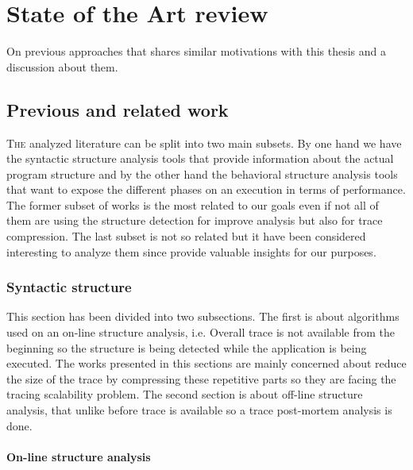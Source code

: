 \chapter{State of the Art review}

On previous approaches that shares similar motivations with this thesis and a
discussion about them. 

\section{Previous and related work}\label{related_work}

\lettrine{T}{he} analyzed literature can be split into two main subsets. By one hand we have 
the syntactic structure analysis tools that provide information about the actual 
program structure and by the other hand the behavioral structure analysis tools
that want to expose the different phases on an execution in terms of performance. 
The former subset of works is the most related to our goals even if not all of
them are using the structure detection for improve analysis but also for
trace compression. The last subset is not so related but it have been considered
interesting to analyze them since provide valuable insights for our purposes.

\subsection{Syntactic structure}\label{ss:syntactic_structure}

This section has been divided into two subsections. The first is about
algorithms used on an on-line structure analysis, i.e. Overall trace is not 
available from the beginning so the structure is being detected while the
application is being executed. The works presented in this sections are 
mainly concerned about reduce the size of the trace by compressing these
repetitive parts so they are facing the tracing scalability problem. The second 
section is about off-line structure analysis, that unlike before trace is 
available so a trace post-mortem analysis is done.
 
\subsubsection{On-line structure analysis}


